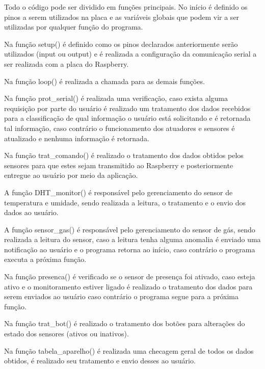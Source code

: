 \par Todo o código pode ser dividido em funções principais. No início é definido os pinos a serem utilizados na placa e as variáveis globais que podem vir a ser utilizadas por qualquer função do programa.
\par Na função setup() é definido como os pinos declarados anteriormente serão utilizados (input ou output) e é realizada a configuração da comunicação serial a ser realizada com a placa do Raspberry.
\par Na função loop() é realizada a chamada para as demais funções.
\par Na função prot\_serial() é realizada uma verificação, caso exista alguma requisição por parte do usuário é realizado um tratamento dos dados recebidos para a classificação de qual informação o usuário está solicitando e é retornada tal informação, caso contrário o funcionamento dos atuadores e sensores é atualizado e nenhuma informação é retornada.
\par Na função trat\_comando() é realizado o tratamento dos dados obtidos pelos sensores para que estes sejam transmitido ao Raspberry e posteriormente entregue ao usuário por meio da aplicação.
\par A função DHT\_monitor() é responsável pelo gerenciamento do sensor de temperatura e umidade, sendo realizada a leitura, o tratamento e o envio dos dados ao usuário.
\par A função sensor\_gas() é responsável pelo gerenciamento do sensor de gás, sendo realizada a leitura do sensor, caso a leitura tenha alguma anomalia é enviado uma notificação ao usuário e o programa retorna ao início, caso contrário o programa executa a próxima função.
\par Na função presenca() é verificado se o sensor de presença foi ativado, caso esteja ativo e o monitoramento estiver ligado é realizado o tratamento dos dados para serem enviados ao usuário caso contrário o programa segue para a próxima função.
\par Na função trat\_bot() é realizado o tratamento dos botões para alterações do estado dos sensores (ativos ou inativos).
\par Na função tabela\_aparelho() é realizada uma checagem geral de todos os dados obtidos, é realizado seu tratamento e envio desses ao usuário.

